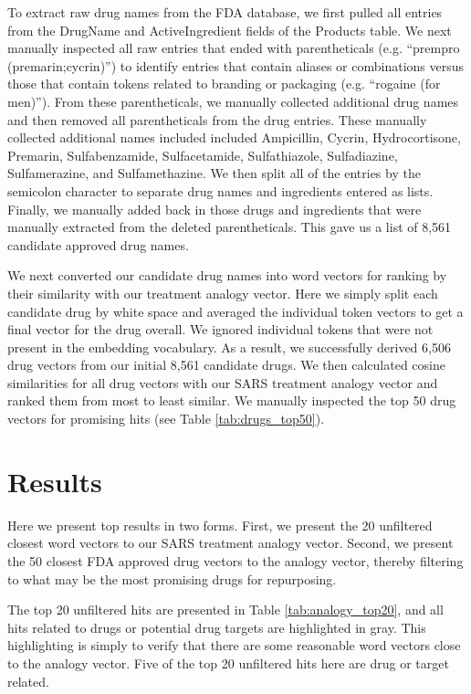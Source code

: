 \documentclass{article}
\begin{document}
To extract raw drug names from the FDA database, we first pulled all entries from the DrugName and ActiveIngredient fields of the Products table.
We next manually inspected all raw entries that ended with parentheticals (e.g. ``prempro (premarin;cycrin)'') to identify entries that contain aliases or combinations versus those that contain tokens related to branding or packaging (e.g. ``rogaine (for men)'').
From these parentheticals, we manually collected additional drug names and then removed all parentheticals from the drug entries.
These manually collected additional names included included Ampicillin, Cycrin, Hydrocortisone, Premarin, Sulfabenzamide, Sulfacetamide, Sulfathiazole, Sulfadiazine, Sulfamerazine, and Sulfamethazine.
We then split all of the entries by the semicolon character to separate drug names and ingredients entered as lists.
Finally, we manually added back in those drugs and ingredients that were manually extracted from the deleted parentheticals.
This gave us a list of 8,561 candidate approved drug names.

We next converted our candidate drug names into word vectors for ranking by their similarity with our treatment analogy vector.
Here we simply split each candidate drug by white space and averaged the individual token vectors to get a final vector for the drug overall.
We ignored individual tokens that were not present in the embedding vocabulary.
As a result, we successfully derived 6,506 drug vectors from our initial 8,561 candidate drugs.
We then calculated cosine similarities for all drug vectors with our SARS treatment analogy vector and ranked them from most to least similar.
We manually inspected the top 50 drug vectors for promising hits (see Table \ref{tab:drugs_top50}).

\section{Results}

Here we present top results in two forms.
First, we present the 20 unfiltered closest word vectors to our SARS treatment analogy vector.
Second, we present the 50 closest FDA approved drug vectors to the analogy vector, thereby filtering to what may be the most promising drugs for repurposing.

The top 20 unfiltered hits are presented in Table \ref{tab:analogy_top20}, and all hits related to drugs or potential drug targets are highlighted in gray.
This highlighting is simply to verify that there are some reasonable word vectors close to the analogy vector.
Five of the top 20 unfiltered hits here are drug or target related.
\end{document}
